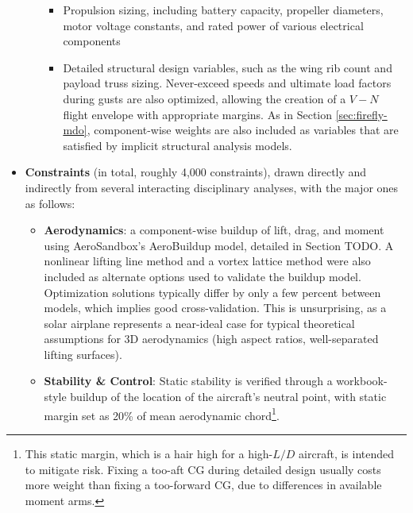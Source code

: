 \begin{example}
\begin{itemize}
\begin{itemize}
\begin{itemize}
                \item Propulsion sizing, including battery capacity, propeller diameters, motor voltage constants, and rated power of various electrical components

                \item Detailed structural design variables, such as the wing rib count and payload truss sizing. Never-exceed speeds and ultimate load factors during gusts are also optimized, allowing the creation of a $V-N$ flight envelope with appropriate margins. As in Section \ref{sec:firefly-mdo}, component-wise weights are also included as variables that are satisfied by implicit structural analysis models.
            \end{itemize}
        \end{itemize}

        \item \textbf{Constraints} (in total, roughly 4,000 constraints), drawn directly and indirectly from several interacting disciplinary analyses, with the major ones as follows:
        \begin{itemize}

            \item \textbf{Aerodynamics}: a component-wise buildup of lift, drag, and moment using AeroSandbox's AeroBuildup model, detailed in Section TODO. A nonlinear lifting line method and a vortex lattice method were also included as alternate options used to validate the buildup model. Optimization solutions typically differ by only a few percent between models, which implies good cross-validation. This is unsurprising, as a solar airplane represents a near-ideal case for typical theoretical assumptions for 3D aerodynamics (high aspect ratios, well-separated lifting surfaces).

            \item \textbf{Stability \& Control}: Static stability is verified through a workbook-style buildup of the location of the aircraft's neutral point, with static margin set as 20\% of mean aerodynamic chord\footnote{This static margin, which is a hair high for a high-$L/D$ aircraft, is intended to mitigate risk. Fixing a too-aft CG during detailed design usually costs more weight than fixing a too-forward CG, due to differences in available moment arms.}.


\end{itemize}
\end{itemize}
\end{example}

